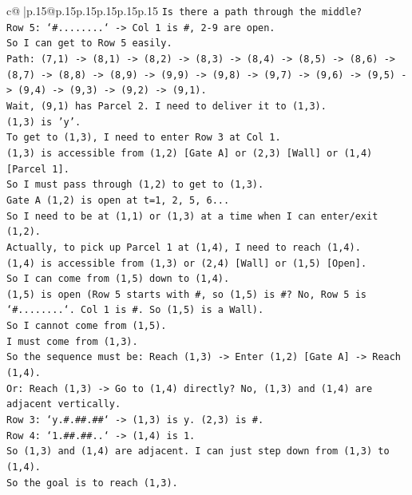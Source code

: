 \documentclass{article}
\begin{document}
{\begin{supertabular}{c@{$\;$}|p{.15\linewidth}@{}p{.15\linewidth}p{.15\linewidth}p{.15\linewidth}p{.15\linewidth}p{.15\linewidth}}
{{{\texttt{Is there a path through the middle?} \\
\texttt{Row 5: `\#........` {-}> Col 1 is \#, 2{-}9 are open.} \\
\texttt{So I can get to Row 5 easily.} \\
\texttt{Path: (7,1) {-}> (8,1) {-}> (8,2) {-}> (8,3) {-}> (8,4) {-}> (8,5) {-}> (8,6) {-}> (8,7) {-}> (8,8) {-}> (8,9) {-}> (9,9) {-}> (9,8) {-}> (9,7) {-}> (9,6) {-}> (9,5) {-}> (9,4) {-}> (9,3) {-}> (9,2) {-}> (9,1).} \\
\texttt{Wait, (9,1) has Parcel 2. I need to deliver it to (1,3).} \\
\texttt{(1,3) is 'y'.} \\
\texttt{To get to (1,3), I need to enter Row 3 at Col 1.} \\
\texttt{(1,3) is accessible from (1,2) {[}Gate A{]} or (2,3) {[}Wall{]} or (1,4) {[}Parcel 1{]}.} \\
\texttt{So I must pass through (1,2) to get to (1,3).} \\
\texttt{Gate A (1,2) is open at t=1, 2, 5, 6...} \\
\texttt{So I need to be at (1,1) or (1,3) at a time when I can enter/exit (1,2).} \\
\texttt{Actually, to pick up Parcel 1 at (1,4), I need to reach (1,4).} \\
\texttt{(1,4) is accessible from (1,3) or (2,4) {[}Wall{]} or (1,5) {[}Open{]}.} \\
\texttt{So I can come from (1,5) down to (1,4).} \\
\texttt{(1,5) is open (Row 5 starts with \#, so (1,5) is \#? No, Row 5 is `\#........`. Col 1 is \#. So (1,5) is a Wall).} \\
\texttt{So I cannot come from (1,5).} \\
\texttt{I must come from (1,3).} \\
\texttt{So the sequence must be: Reach (1,3) {-}> Enter (1,2) {[}Gate A{]} {-}> Reach (1,4).} \\
\texttt{Or: Reach (1,3) {-}> Go to (1,4) directly? No, (1,3) and (1,4) are adjacent vertically.} \\
\texttt{Row 3: `y.\#.\#\#.\#\#` {-}> (1,3) is y. (2,3) is \#.} \\
\texttt{Row 4: `1.\#\#.\#\#..` {-}> (1,4) is 1.} \\
\texttt{So (1,3) and (1,4) are adjacent. I can just step down from (1,3) to (1,4).} \\
\texttt{So the goal is to reach (1,3).} \\
}}}
\end{supertabular}}
\end{document}
